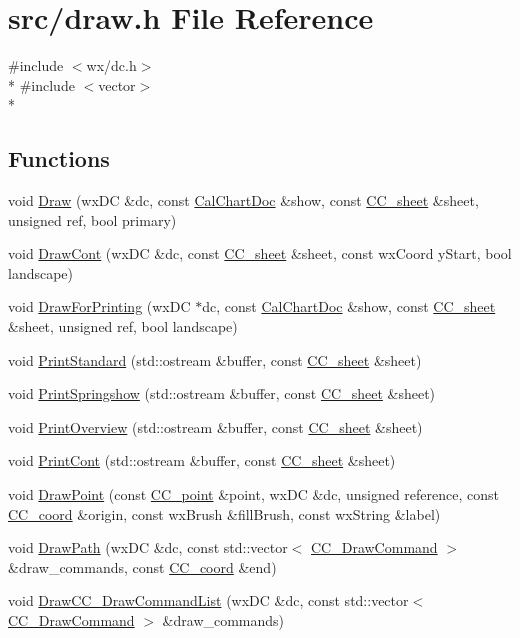 \hypertarget{a00223}{\section{src/draw.h File Reference}
\label{a00223}
}
{\ttfamily \#include $<$wx/dc.\-h$>$}\\*
{\ttfamily \#include $<$vector$>$}\\*
\subsection*{Functions}
\begin{DoxyCompactItemize}
\item 
void \hyperlink{a00223_a9c84907a1eefb185f3bac8be2c36d5ad}{Draw} (wx\-D\-C \&dc, const \hyperlink{a00020}{Cal\-Chart\-Doc} \&show, const \hyperlink{a00045}{C\-C\-\_\-sheet} \&sheet, unsigned ref, bool primary)
\item 
void \hyperlink{a00223_a086b0d11791ce4f8844bffe82d76642a}{Draw\-Cont} (wx\-D\-C \&dc, const \hyperlink{a00045}{C\-C\-\_\-sheet} \&sheet, const wx\-Coord y\-Start, bool landscape)
\item 
void \hyperlink{a00223_afbd7f1c47062e5687261e1dab19ad245}{Draw\-For\-Printing} (wx\-D\-C $\ast$dc, const \hyperlink{a00020}{Cal\-Chart\-Doc} \&show, const \hyperlink{a00045}{C\-C\-\_\-sheet} \&sheet, unsigned ref, bool landscape)
\item 
void \hyperlink{a00223_a876dd679d215359f84649b7425be8c9c}{Print\-Standard} (std\-::ostream \&buffer, const \hyperlink{a00045}{C\-C\-\_\-sheet} \&sheet)
\item 
void \hyperlink{a00223_a8470696ddaa642977258b6a7bfcb81fd}{Print\-Springshow} (std\-::ostream \&buffer, const \hyperlink{a00045}{C\-C\-\_\-sheet} \&sheet)
\item 
void \hyperlink{a00223_a9661f9c950cdce548b123f4e70b040f6}{Print\-Overview} (std\-::ostream \&buffer, const \hyperlink{a00045}{C\-C\-\_\-sheet} \&sheet)
\item 
void \hyperlink{a00223_ad71ee05170177b850afc811542c7b1c5}{Print\-Cont} (std\-::ostream \&buffer, const \hyperlink{a00045}{C\-C\-\_\-sheet} \&sheet)
\item 
void \hyperlink{a00223_ac13870e1591af9c6df39e179b330fc97}{Draw\-Point} (const \hyperlink{a00034}{C\-C\-\_\-point} \&point, wx\-D\-C \&dc, unsigned reference, const \hyperlink{a00029}{C\-C\-\_\-coord} \&origin, const wx\-Brush \&fill\-Brush, const wx\-String \&label)
\item 
void \hyperlink{a00223_a4adaedde3065588e0885145119f525aa}{Draw\-Path} (wx\-D\-C \&dc, const std\-::vector$<$ \hyperlink{a00031}{C\-C\-\_\-\-Draw\-Command} $>$ \&draw\-\_\-commands, const \hyperlink{a00029}{C\-C\-\_\-coord} \&end)
\item 
void \hyperlink{a00223_a35fc6442f62d162b1315bb7d282ead45}{Draw\-C\-C\-\_\-\-Draw\-Command\-List} (wx\-D\-C \&dc, const std\-::vector$<$ \hyperlink{a00031}{C\-C\-\_\-\-Draw\-Command} $>$ \&draw\-\_\-commands)
\end{DoxyCompactItemize}


